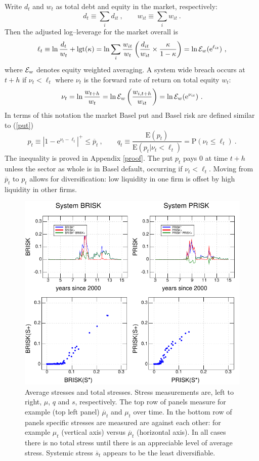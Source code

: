 \documentclass[12pt]{article}
\newcommand{\logit}{\mathrm{lgt}}
\newcommand{\E}{\mathrm{E}}
\newcommand{\p}{\mathrm{P}}
\newcommand{\e}{\mathrm{e}}
\newcommand{\Ex}{{\cal E}}
\newcommand{\eref}[1]{(\ref{#1})}
\newcommand{\aref}[1]{Appendix \ref{#1}}
\newcommand{\cq}{\ , \qquad}
\newcommand{\be}[1]{\begin{equation}\label{#1}}
\newcommand{\ee}{\end{equation}}
\begin{document}
Write  $d_t$ and $w_t$ as total debt and equity in the market, respectively:
$$
d_t \equiv \sum_i d_{it}\cq w_{it} \equiv \sum_i w_{it}\ .
$$
Then the   adjusted log--leverage for the market overall is
$$
\ell_t \equiv  \ln \frac{d_t}{w_t} +\logit(\kappa) =  \ln \sum_i\frac{w_{it}}{w_t}\left(\frac{ d_{it}}{ w_{it}}\times \frac{\kappa}{1-\kappa}\right) = \ln \Ex_w(\e^{\ell_{it}}) \ ,
$$
where $\Ex_w$ denotes equity weighted averaging.  A system wide breach occurs at $t+h$ if
$
\nu_t < \ell_t
$
where $\nu_t$ is the forward rate of return on total equity $w_t$:
\be{ew}
 \nu_t =  \ln \frac{w_{t+h}}{w_t} = \ln\Ex_w\left(\frac{w_{i,t+h}}{w_{it}}\right) = \ln \Ex_w(\e^{\nu_{it}})\ .
\ee
In terms of this notation the market Basel put  and Basel risk are defined similar to \eref{put}
$$
p_t\equiv \left|1-\e^{\nu_t-\ell_t}\right|^+\le \overline p_t\cq q_t\equiv \frac{\E(p_t)}{\E(p_{t}|\nu_t<\ell_t)}=\p(\nu_t\le \ell_t) \ .
$$
The inequality is proved in  \aref{proof}.  The  put $p_t$ pays 0 at time $t+h$ unless the sector as whole is in Basel default, occurring if $\nu_t  <  \ell_t$. Moving from $\overline p_t$ to $p_t$  allows for diversification:   low liquidity  in one firm is offset by high liquidity  in other  firms.

\begin{figure}[htbp]
\begin{center}
\includegraphics{figures/muqs.pdf}
\caption{Average  stresses and  total stresses.   Stress measurements are, left to right, $\mu$, $q$ and $s$, respectively.   The top row of panels measure for example (top left panel)  $\overline \mu_t$ and $\mu_t$ over time.    In the bottom row of panels  specific stresses are measured are against each other:  for example $\mu_t$ (vertical axis) versus $\overline\mu_t$ (horizontal axis).  In all cases there is no total stress until there is an appreciable level of average stress.  Systemic stress $\overline s_t$ appears to be the least diversifiable.}\label{muqs}
\end{center}
\end{figure}
\end{document}
